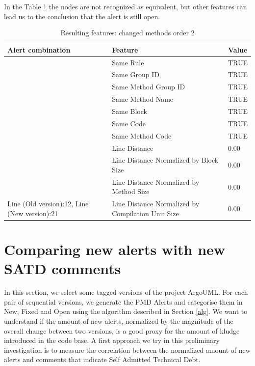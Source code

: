\documentclass[
]{article}
\begin{document}
\newpage

In the Table \ref{changing_method_order_2} the nodes are not recognized
as equivalent, but other features can lead us to the conclusion that the
alert is still open.

\small

\begin{table}[!h]

\caption{\label{tab:unnamed-chunk-19}Resulting features: changed methods order 2 \label{changing_method_order_2} }
\centering
\begin{tabular}[t]{l|l|l}
\hline
Alert combination & Feature & Value\\
\hline
\rowcolor{gray!6}   & Same Rule & TRUE\\

 & Same Group ID & TRUE\\

\rowcolor{gray!6}   & Same Method Group ID & TRUE\\

 & Same Method Name & TRUE\\

\rowcolor{gray!6}   & Same Block & TRUE\\

 & Same Code & TRUE\\

\rowcolor{gray!6}   & Same Method Code & TRUE\\

 & Line Distance & 0.00\\

\rowcolor{gray!6}   & Line Distance Normalized by Block Size & 0.00\\

 & Line Distance Normalized by Method Size & 0.00\\

\multirow[t]{-11}{*}{\raggedright\arraybackslash Line (Old version):12, Line (New version):21} & Line Distance Normalized by Compilation Unit Size & 0.00\\
\hline
\end{tabular}
\end{table}

\normalsize

\section{Comparing new alerts with new SATD comments}\label{results}

In this section, we select some tagged versions of the project ArgoUML.
For each pair of sequential versions, we generate the PMD Alerts and
categorise them in New, Fixed and Open using the algorithm described in
Section \ref{alg}. We want to understand if the amount of new alerts,
normalized by the magnitude of the overall change between two versions,
is a good proxy for the amount of kludge introduced in the code base. A
first approach we try in this preliminary investigation is to measure
the correlation between the normalized amount of new alerts and comments
that indicate Self Admitted Technical Debt.
\end{document}
